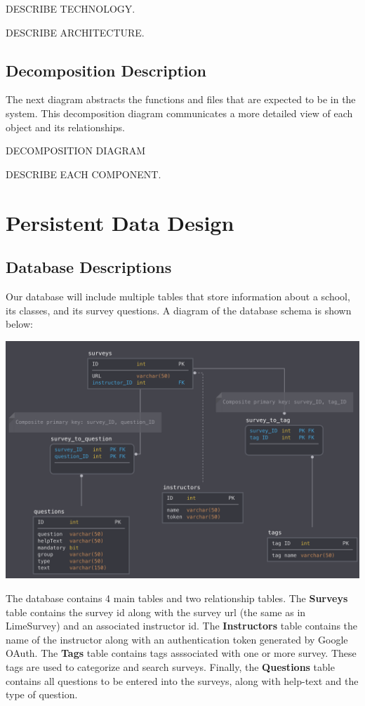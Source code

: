 \documentclass{article}
\begin{document}
DESCRIBE TECHNOLOGY.

DESCRIBE ARCHITECTURE.

\subsection{Decomposition Description}

The next diagram abstracts the functions and files that are expected to be in the system. This decomposition diagram communicates a more detailed view of each object and its relationships.

DECOMPOSITION DIAGRAM

DESCRIBE EACH COMPONENT.

\newpage

\section{Persistent Data Design}
\subsection{Database Descriptions}

Our database will include multiple tables that store information about a school, its classes, and its survey questions. A diagram of the database schema is shown below:

\begin{center}
{\includegraphics[scale=.5]{images/schema_diagram.png}} 
\end{center}
The database contains 4 main tables and two relationship tables. The \textbf{Surveys} table contains the survey id along with the survey url (the same as in LimeSurvey) and an associated instructor id. The \textbf{Instructors} table contains the name of the instructor along with an authentication token generated by Google OAuth. The \textbf{Tags} table contains tags asssociated with one or more survey. These tags are used to categorize and search surveys. Finally, the \textbf{Questions} table contains all questions to be entered into the surveys, along with help-text and the type of question. 
\end{document}
